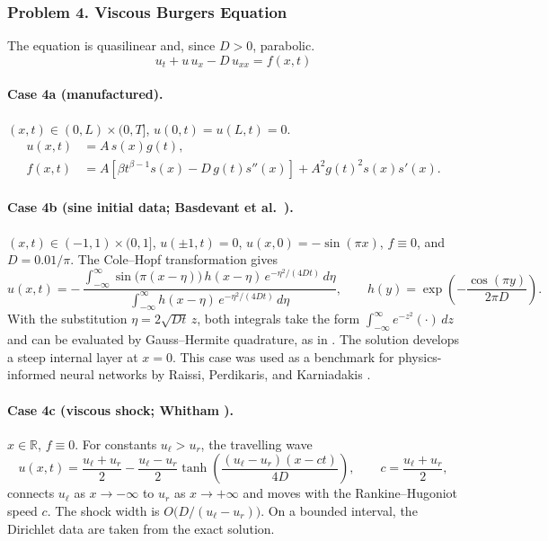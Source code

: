 \documentclass[11pt]{article}
\begin{document}
\subsubsection*{Problem 4. Viscous Burgers Equation}

The equation is quasilinear and, since $D>0$, parabolic.
\[
\boxed{u_t+u\,u_x-D\,u_{xx}=f(x,t)}
\]

\paragraph{Case 4a (manufactured).}
$(x,t)\in(0,L)\times(0,T]$, $u(0,t)=u(L,t)=0$.
\[
\begin{aligned}
u(x,t)&=A\,s(x)g(t),\\
f(x,t)&=A\left[
\beta t^{\beta-1}s(x)-D\,g(t)s''(x)
\right]
+A^2g(t)^2s(x)s'(x).
\end{aligned}
\]

\paragraph{Case 4b (sine initial data; Basdevant et al.\ \cite{Bas86}).}
$(x,t)\in(-1,1)\times(0,1]$, $u(\pm1,t)=0$, $u(x,0)=-\sin(\pi x)$,
$f\equiv0$, and $D=0.01/\pi$. The Cole--Hopf transformation gives
\[
u(x,t)=-\,\frac{\displaystyle\int_{-\infty}^{\infty}
\sin\bigl(\pi(x-\eta)\bigr)\,h(x-\eta)\,e^{-\eta^2/(4Dt)}\,d\eta}
{\displaystyle\int_{-\infty}^{\infty}
h(x-\eta)\,e^{-\eta^2/(4Dt)}\,d\eta},
\qquad
h(y)=\exp\!\left(-\frac{\cos(\pi y)}{2\pi D}\right).
\]
With the substitution $\eta=2\sqrt{Dt}\,z$, both integrals take the
form $\int_{-\infty}^{\infty}e^{-z^2}(\cdot)\,dz$ and can be evaluated
by Gauss--Hermite quadrature, as in \cite{Bas86}. The solution develops
a steep internal layer at $x=0$. This case was used as a benchmark for
physics-informed neural networks by Raissi, Perdikaris, and Karniadakis
\cite{RPK19}.

\paragraph{Case 4c (viscous shock; Whitham \cite[Ch.~4]{Whi74}).}
$x\in\mathbb{R}$, $f\equiv0$. For constants $u_\ell>u_r$, the travelling
wave
\[
u(x,t)=\frac{u_\ell+u_r}{2}
-\frac{u_\ell-u_r}{2}
\tanh\!\left(\frac{(u_\ell-u_r)(x-ct)}{4D}\right),
\qquad
c=\frac{u_\ell+u_r}{2},
\]
connects $u_\ell$ as $x\to-\infty$ to $u_r$ as $x\to+\infty$ and moves
with the Rankine--Hugoniot speed $c$. The shock width is
$O\bigl(D/(u_\ell-u_r)\bigr)$. On a bounded interval, the Dirichlet data
are taken from the exact solution.
\end{document}
